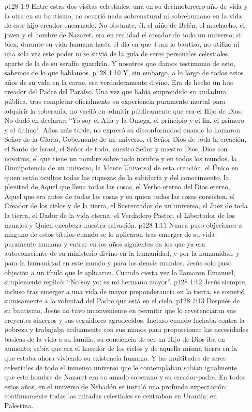 \vs p128 1:9 Entre estas dos visitas celestiales, una en su decimotercero año de vida y la otra en su bautismo, no ocurrió nada sobrenatural ni sobrehumano en la vida de este hijo creador encarnado. No obstante, él, el niño de Belén, el muchacho, el joven y el hombre de Nazaret, era en realidad el creador de todo un universo; si bien, durante su vida humana hasta el día en que Juan lo bautizó, no utilizó ni una sola vez este poder ni se sirvió de la guía de seres personales celestiales, aparte de la de su serafín guardián. Y nosotros que damos testimonio de esto, sabemos de lo que hablamos.
\vs p128 1:10 Y, sin embargo, a lo largo de todos estos años de su vida en la carne, era verdaderamente divino. Era de hecho un hijo creador del Padre del Paraíso. Una vez que había emprendido su andadura pública, tras completar oficialmente su experiencia puramente mortal para adquirir la soberanía, no vaciló en admitir públicamente que era el Hijo de Dios. No dudó en declarar: “Yo soy el Alfa y la Omega, el principio y el fin, el primero y el último”. Años más tarde, no expresó su disconformidad cuando lo llamaron Señor de la Gloria, Gobernante de un universo, el Señor Dios de toda la creación, el Santo de Israel, el Señor de todo, nuestro Señor y nuestro Dios, Dios con nosotros, el que tiene un nombre sobre todo nombre y en todos los mundos, la Omnipotencia de un universo, la Mente Universal de esta creación, el Único en quien están ocultos todas las riquezas de la sabiduría y del conocimiento, la plenitud de Aquel que llena todas las cosas, el Verbo eterno del Dios eterno, Aquel que era antes de todas las cosas y en quien todas las cosas consisten, el Creador de los cielos y de la tierra, el Sustentador de un universo, el Juez de toda la tierra, el Dador de la vida eterna, el Verdadero Pastor, el Libertador de los mundos y Quien encabeza nuestra salvación.
\vs p128 1:11 \pc Nunca puso objeciones a ninguno de estos títulos cuando se lo aplicaron tras emerger de su vida puramente humana y entrar en los años siguientes en los que ya era autoconsciente de su ministerio divino en la humanidad, y por la humanidad, y para la humanidad en este mundo y para los demás mundos. Jesús solo puso objeción a un título que le aplicaron. Cuando cierta vez lo llamaron Emanuel, simplemente replicó: “No soy yo; es mi hermano mayor”.
\vs p128 1:12 Jesús siempre, incluso tras emerger a una vida de mayor preponderancia en la tierra, se sometió sumisamente a la voluntad del Padre que está en el cielo.
\vs p128 1:13 Después de su bautismo, Jesús no tuvo inconveniente en permitir que lo reverenciaran sus creyentes sinceros y sus seguidores agradecidos. Incluso cuando luchaba contra la pobreza y trabajaba arduamente con sus manos para proporcionar las necesidades básicas de la vida a su familia, su conciencia de ser un Hijo de Dios iba en aumento; sabía que era el hacedor de los cielos y de aquella misma tierra en la que estaba ahora viviendo su existencia humana. Y las multitudes de seres celestiales de todo el inmenso universo que le contemplaban sabían igualmente que este hombre de Nazaret era su amado soberano y su creador\hyp{}padre. En todos estos años, en el universo de Nebadón se instaló una profunda expectación; continuamente todas las miradas celestiales se centraban en Urantia: en Palestina.
